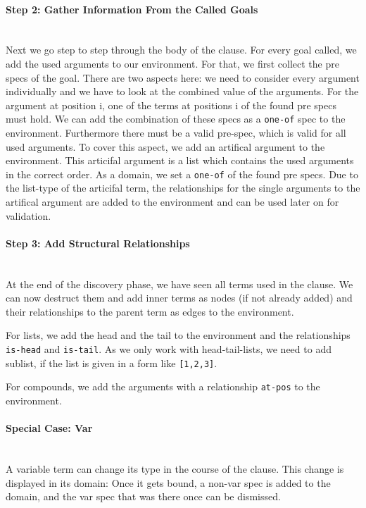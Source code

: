 \documentclass[a4paper]{article}
\begin{document}
\paragraph{Step 2: Gather Information From the Called Goals}\hfill\\
Next we go step to step through the body of the clause. For every goal called,
we add the used arguments to our environment.
For that, we first collect the pre specs of the goal. There are two aspects
here: we need to consider every argument individually and
we have to look at the combined value of the arguments.
For the argument at position i, one of the
terms at positions i of the found pre specs must hold. We can add the
combination of these specs as a \texttt{one-of} spec to the environment.
Furthermore there must be a valid pre-spec, which is valid for all used
arguments. To cover this aspect, we add an artifical argument to the
environment. This articifal argument is a list which contains the used arguments
in the correct order. As a domain, we set a \texttt{one-of} of the found pre
specs.
Due to the list-type of the articifal term, the relationships for the single
arguments to the artifical argument are added to the environment and can be used
later on for validation.

\paragraph{Step 3: Add Structural Relationships}\hfill\\
At the end of the discovery phase, we have seen all terms used in the clause.
We can now destruct them and add inner terms as nodes (if not already added) and their
relationships to the parent term as edges to the environment.

For lists, we add the head and the tail to the environment and the relationships
\texttt{is-head} and \texttt{is-tail}. As we only work with head-tail-lists, we
need to add sublist, if the list is given in a form like \texttt{[1,2,3]}.

For compounds, we add the arguments with a relationship \texttt{at-pos} to the
environment.

\paragraph{Special Case: Var}\hfill\\
A variable term can change its type in the course of the clause. This change is
displayed in its domain: Once it gets bound, a non-var spec is added to the
domain, and the var spec that was there once can be dismissed.
\end{document}
